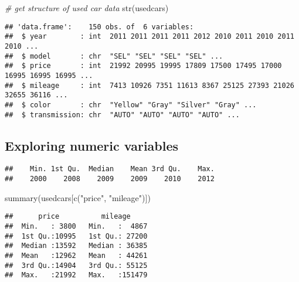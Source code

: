 \documentclass[
]{article}
\newenvironment{Shaded}{\begin{snugshade}}{\end{snugshade}}
\newcommand{\CommentTok}[1]{\textcolor[rgb]{0.56,0.35,0.01}{\textit{#1}}}
\newcommand{\DocumentationTok}[1]{\textcolor[rgb]{0.56,0.35,0.01}{\textbf{\textit{#1}}}}
\newcommand{\FunctionTok}[1]{\textcolor[rgb]{0.00,0.00,0.00}{#1}}
\newcommand{\NormalTok}[1]{#1}
\newcommand{\SpecialCharTok}[1]{\textcolor[rgb]{0.00,0.00,0.00}{#1}}
\newcommand{\StringTok}[1]{\textcolor[rgb]{0.31,0.60,0.02}{#1}}
\begin{document}
\begin{Shaded}
\begin{Highlighting}[]
\CommentTok{\# get structure of used car data}
\FunctionTok{str}\NormalTok{(usedcars)}
\end{Highlighting}
\end{Shaded}

\begin{verbatim}
## 'data.frame':    150 obs. of  6 variables:
##  $ year        : int  2011 2011 2011 2011 2012 2010 2011 2010 2011 2010 ...
##  $ model       : chr  "SEL" "SEL" "SEL" "SEL" ...
##  $ price       : int  21992 20995 19995 17809 17500 17495 17000 16995 16995 16995 ...
##  $ mileage     : int  7413 10926 7351 11613 8367 25125 27393 21026 32655 36116 ...
##  $ color       : chr  "Yellow" "Gray" "Silver" "Gray" ...
##  $ transmission: chr  "AUTO" "AUTO" "AUTO" "AUTO" ...
\end{verbatim}

\hypertarget{exploring-numeric-variables}{%
\subsection{Exploring numeric
variables}\label{exploring-numeric-variables}}

\begin{Shaded}
\end{Shaded}

\begin{verbatim}
##    Min. 1st Qu.  Median    Mean 3rd Qu.    Max. 
##    2000    2008    2009    2009    2010    2012
\end{verbatim}

\begin{Shaded}
\begin{Highlighting}[]
\FunctionTok{summary}\NormalTok{(usedcars[}\FunctionTok{c}\NormalTok{(}\StringTok{"price"}\NormalTok{, }\StringTok{"mileage"}\NormalTok{)])}
\end{Highlighting}
\end{Shaded}

\begin{verbatim}
##      price          mileage      
##  Min.   : 3800   Min.   :  4867  
##  1st Qu.:10995   1st Qu.: 27200  
##  Median :13592   Median : 36385  
##  Mean   :12962   Mean   : 44261  
##  3rd Qu.:14904   3rd Qu.: 55125  
##  Max.   :21992   Max.   :151479
\end{verbatim}
\end{document}
